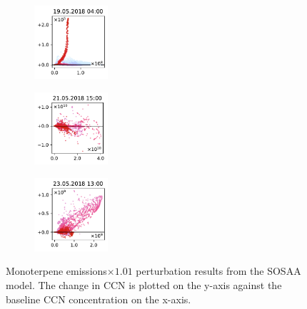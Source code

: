 \begin{figure}[H]
    \begin{subfigure}
        \centering
        \includegraphics[width=0.30\textwidth,valign=t]{evaluation/figures/perturbations/perturbation-19.05.2018:04.00-monoterpenes-mul-1.01.pdf}
    \end{subfigure}
    \begin{subfigure}
        \centering
        \includegraphics[width=0.30\textwidth,valign=t]{evaluation/figures/perturbations/perturbation-21.05.2018:15.00-monoterpenes-mul-1.01.pdf}
    \end{subfigure}
    \begin{subfigure}
        \centering
        \includegraphics[width=0.30\textwidth,valign=t]{evaluation/figures/perturbations/perturbation-23.05.2018:13.00-monoterpenes-mul-1.01.pdf}
    \end{subfigure}

    \caption[Monoterpene emissions$\times 1.01$ perturbation SOSAA results]{Monoterpene emissions$\times 1.01$ perturbation results from the SOSAA model. The change in CCN is plotted on the y-axis against the baseline CCN concentration on the x-axis.}
    \label{fig:sosaa-perturbation-monoterpenes-mul-1.01}
\end{figure}

